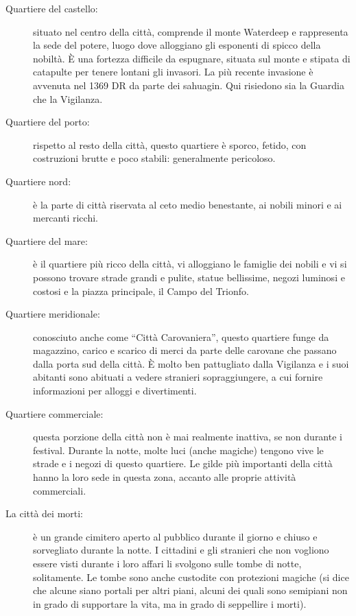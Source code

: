 \documentclass{article}
\begin{document}
                          \begin{description}
                              \item[Quartiere del castello:] situato nel centro della città, comprende il monte Waterdeep e rappresenta la sede del potere, luogo dove alloggiano gli esponenti di spicco della nobiltà. È una fortezza difficile da espugnare, situata sul monte e stipata di catapulte per tenere lontani gli invasori. La più recente invasione è avvenuta nel 1369 DR da parte dei sahuagin. Qui risiedono sia la Guardia che la Vigilanza.
                              
                              \item[Quartiere del porto:] rispetto al resto della città, questo quartiere è sporco, fetido, con costruzioni brutte e poco stabili: generalmente pericoloso.
                              
                              \item[Quartiere nord:] è la parte di città riservata al ceto medio benestante, ai nobili minori e ai mercanti ricchi.
                              
                              \item[Quartiere del mare:] è il quartiere più ricco della città, vi alloggiano le famiglie dei nobili e vi si possono trovare strade grandi e pulite, statue bellissime, negozi luminosi e costosi e la piazza principale, il Campo del Trionfo.
                              
                              \item[Quartiere meridionale:] conosciuto anche come “Città Carovaniera”, questo quartiere funge da magazzino, carico e scarico di merci da parte delle carovane che passano dalla porta sud della città. È molto ben pattugliato dalla Vigilanza e i suoi abitanti sono abituati a vedere stranieri sopraggiungere, a cui fornire informazioni per alloggi e divertimenti.
                              
                              \item[Quartiere commerciale:] questa porzione della città non è mai realmente inattiva, se non durante i festival. Durante la notte, molte luci (anche magiche) tengono vive le strade e i negozi di questo quartiere. Le gilde più importanti della città hanno la loro sede in questa zona, accanto alle proprie attività commerciali.
                              
                              \item[La città dei morti:] è un grande cimitero aperto al pubblico durante il giorno e chiuso e sorvegliato durante la notte. I cittadini e gli stranieri che non vogliono essere visti durante i loro affari li svolgono sulle tombe di notte, solitamente. Le tombe sono anche custodite con protezioni magiche (si dice che alcune siano portali per altri piani, alcuni dei quali sono semipiani non in grado di supportare la vita, ma in grado di seppellire i morti).
                          \end{description}
                  
\end{document}
